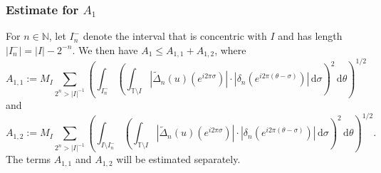 \documentclass[a4paper, leqno, 10pt]{amsart}
\numberwithin{equation}{section}
\newcommand{\dd}{\mathrm{d}}
\newcommand{\T}{\mathbb{T}}
\newcommand{\abs}[1]{\left|#1\right|}
\newcommand{\N}{\mathbb{N}}
\begin{document}
\subsubsection*{Estimate for $A_1$}
%
For $n \in \N$, let $I_n^-$ denote the interval that is concentric with $I$ and has length $| I_n^- | = | I | - 2^{-n}$. We then have $ A_1 \leq A_{1,1} + A_{1,2}$, 
where
\[
A_{1,1} := M_I \sum_{ 2^n > | I |^{-1} } \left( \int_{I_n^-} \left(   \int_{\T \setminus I} \abs{ \widetilde{\Delta}_n (u) (e^{i 2 \pi \sigma})  } \cdot \abs{ \delta_n \left( e^{i 2 \pi (\theta - \sigma )  } \right) }  \, \dd \sigma  \right)^2 \, \dd \theta \right)^{1/2} 
\]
and
\[
A_{1,2} := M_I \sum_{ 2^n > | I |^{-1} } \left( \int_{ I \setminus I_n^-} \left( \int_{\T \setminus I} \abs{ \widetilde{\Delta}_n (u) (e^{i 2 \pi \sigma}) } \cdot \abs{ \delta_n \left( e^{i 2 \pi (\theta - \sigma )  } \right) }  \, \dd \sigma  \right)^2 \, \dd \theta \right)^{1/2} .
\]
The terms $A_{1,1}$ and $A_{1,2}$ will be estimated separately.

%
\end{document}
